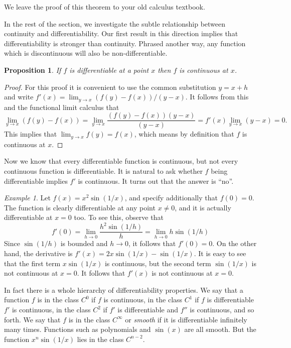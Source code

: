 \documentclass[11pt,oneside]{amsbook}
\theoremstyle{definition}
\theoremstyle{plain}
\newtheorem{prop}[thm]{Proposition}
\theoremstyle{definition}
\theoremstyle{remark}
\newtheorem{example}[thm]{Example}
\numberwithin{equation}{section}
\numberwithin{figure}{section}
\begin{document}
We leave the proof of this theorem to your old calculus textbook.

In the rest of the section, we investigate the subtle relationship between continuity and differentiability. Our first result in this direction implies that differentiability is stronger than continuity. Phrased another way, any function which is discontinuous will also be non-differentiable.

\begin{prop}
  If $f$ is differentiable at a point $x$ then $f$ is continuous at $x$.
\end{prop}

\begin{proof}
  For this proof it is convenient to use the common substitution $y=x+h$ and write $f'(x)=\lim_{y\to x}(f(y)-f(x))/(y-x)$. It follows from this and the functional limit calculus that
\[\lim_{y\to x}(f(y)-f(x))=\lim_{y\to x}\frac{(f(y)-f(x))(y-x)}{(y-x)}
=f'(x)\lim_{y\to x}(y-x)=0\text{.}
\]
This implies that $\lim_{y\to x}f(y)=f(x)$, which means by definition that $f$ is continuous at $x$.
\end{proof}

Now we know that every differentiable function is continuous, but not every continuous function is differentiable. It is natural to ask whether $f$ being differentiable implies $f'$ is continuous. It turns out that the answer is ``no''.

\begin{example}
  Let $f(x)=x^2\sin(1/x)$, and specify additionally that $f(0)=0$. The function is clearly differentiable at any point $x\neq0$, and it is actually differentiable at $x=0$ too. To see this, observe that
\[f'(0)=\lim_{h\to0}\frac{h^2\sin(1/h)}{h}=\lim_{h\to0}h\sin(1/h)
\]
Since $\sin(1/h)$ is bounded and $h\to 0$, it follows that $f'(0)=0$. On the other hand, the derivative is $f'(x)=2x\sin(1/x)-\sin(1/x)$. It is easy to see that the first term $x\sin(1/x)$ is continuous, but the second term $\sin(1/x)$ is not continuous at $x=0$. It follows that $f'(x)$ is not continuous at $x=0$.
\end{example}

In fact there is a whole hierarchy of differentiability properties. We say that a function $f$ is in the class $C^0$ if $f$ is continuous, in the class $C^1$ if $f$ is differentiable $f'$ is continuous, in the class $C^2$ if $f'$ is differentiable and $f''$ is continuous, and so forth. We say that $f$ is in the class $C^\infty$ or \emph{smooth} if it is differentiable infinitely many times. Functions such as polynomials and $\sin(x)$ are all smooth. But the function $x^n\sin(1/x)$ lies in the class $C^{n-2}$.
\end{document}
